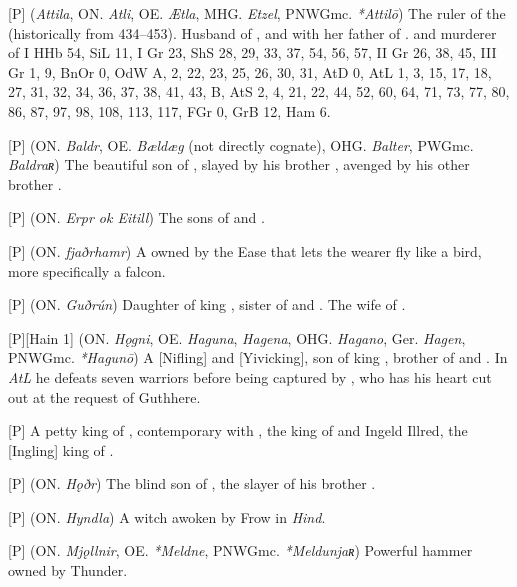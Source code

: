 \begin{itemize}

[P] (\emph{Attila}, ON. \emph{Atli}, OE. \emph{Ætla}, MHG. \emph{Etzel}, PNWGmc. \emph{*Attilō})
  The ruler of the  (historically from 434–453). Husband of , and with her father of . and murderer of
  I HHb 54, SiL 11, I Gr 23, ShS 28, 29, 33, 37, 54, 56, 57, II Gr 26, 38, 45, III Gr 1, 9, BnOr 0, OdW A, 2, 22, 23, 25, 26, 30, 31, AtD 0, AtL 1, 3, 15, 17, 18, 27, 31, 32, 34, 36, 37, 38, 41, 43, B, AtS 2, 4, 21, 22, 44, 52, 60, 64, 71, 73, 77, 80, 86, 87, 97, 98, 108, 113, 117, FGr 0, GrB 12, Ham 6.

[P] (ON. \emph{Baldr}, OE. \emph{Bældæg} (not directly cognate), OHG. \emph{Balter}, PWGmc. \emph{Baldraʀ})
  The beautiful son of , slayed by his brother , avenged by his other brother .

[P] (ON. \emph{Erpr ok Eitill})
  The sons of  and .

[P] (ON. \emph{fjaðrhamr})
  A  owned by the Ease that lets the wearer fly like a bird, more specifically a falcon.

[P] (ON. \emph{Guðrún})
  Daughter of king , sister of  and . The wife of .

[P][Hain 1] (ON. \emph{Hǫgni}, OE. \emph{Haguna}, \emph{Hagena}, OHG. \emph{Hagano}, Ger. \emph{Hagen}, PNWGmc. \emph{*Hagunō})
  A [Nifling] and [Yivicking], son of king , brother of  and . In \emph{AtL} he defeats seven warriors before being captured by , who has his heart cut out at the request of Guthhere.

[P]
  A petty king of , contemporary with , the king of  and Ingeld Illred, the [Ingling] king of .

[P] (ON. \emph{Hǫðr})
  The blind son of , the slayer of his brother .

[P] (ON. \emph{Hyndla}) A witch awoken by Frow in \emph{Hind}.

[P] (ON. \emph{Mjǫllnir}, OE. \emph{*Meldne}, PNWGmc. \emph{*Meldunjaʀ})
  Powerful hammer owned by Thunder.


\end{itemize}
